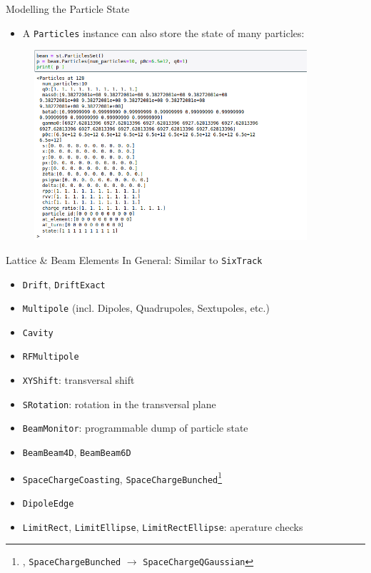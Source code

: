 \documentclass{beamer}
\begin{document}
\begin{frame}{Modelling the Particle State}
\begin{itemize}
\item A \texttt{Particles} instance can also store the state of many particles:
\end{itemize}
\begin{figure}
            \centering
            \includegraphics[width=0.9\textwidth]{images/particle_state_02.png}
\end{figure}
\end{frame}

\begin{frame}{Lattice \& Beam Elements}
In General: Similar to \texttt{SixTrack} 
    \begin{itemize}
        \item \texttt{Drift}, \texttt{DriftExact}
        \item \texttt{Multipole} (incl. Dipoles, Quadrupoles, Sextupoles, etc.)
        \item \texttt{Cavity}
        \item \texttt{RFMultipole}
        \item \texttt{XYShift}: transversal shift
        \item \texttt{SRotation}: rotation in the transversal plane
        \item \texttt{BeamMonitor}: programmable dump of particle state
        \item \texttt{BeamBeam4D}, \texttt{BeamBeam6D}
        \item \texttt{SpaceChargeCoasting}, \texttt{SpaceChargeBunched}\footnote{, \texttt{SpaceChargeBunched} $\rightarrow$ \texttt{SpaceChargeQGaussian}}
        \item \texttt{DipoleEdge}
        \item \texttt{LimitRect}, \texttt{LimitEllipse}, \texttt{LimitRectEllipse}: aperature checks
        \end{itemize}
\end{frame}
\end{document}
